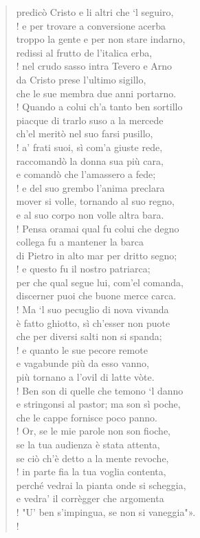 \documentclass[a4paper, twoside, titlepage]{book}
\newcounter{mar}
\begin{document}
\begin{verse}
predicò Cristo e li altri che ‘l seguiro,\\!
e per trovare a conversione acerba\\
troppo la gente e per non stare indarno,\\
redissi al frutto de l’italica erba,\\!
nel crudo sasso intra Tevero e Arno\\
da Cristo prese l’ultimo sigillo,\\
che le sue membra due anni portarno.\\!
Quando a colui ch’a tanto ben sortillo\\
piacque di trarlo suso a la mercede\\
ch’el meritò nel suo farsi pusillo,\\!
a’ frati suoi, sì com’a giuste rede,\\
raccomandò la donna sua più cara,\\
e comandò che l’amassero a fede;\\!
e del suo grembo l’anima preclara\\
mover si volle, tornando al suo regno,\\
e al suo corpo non volle altra bara.\\!
Pensa oramai qual fu colui che degno\\
collega fu a mantener la barca\\
di Pietro in alto mar per dritto segno;\\!
e questo fu il nostro patriarca;\\
per che qual segue lui, com’el comanda,\\
discerner puoi che buone merce carca.\\!
Ma ‘l suo pecuglio di nova vivanda\\
è fatto ghiotto, sì ch’esser non puote\\
che per diversi salti non si spanda;\\!
e quanto le sue pecore remote\\
e vagabunde più da esso vanno,\\
più tornano a l’ovil di latte vòte.\\!
Ben son di quelle che temono ‘l danno\\
e stringonsi al pastor; ma son sì poche,\\
che le cappe fornisce poco panno.\\!
Or, se le mie parole non son fioche,\\
se la tua audienza è stata attenta,\\
se ciò ch’è detto a la mente revoche,\\!
in parte fia la tua voglia contenta,\\
perché vedrai la pianta onde si scheggia,\\
e vedra’ il corrègger che argomenta\\!
"U’ ben s’impingua, se non si vaneggia"».\\!
\end{verse}
\end{document}
